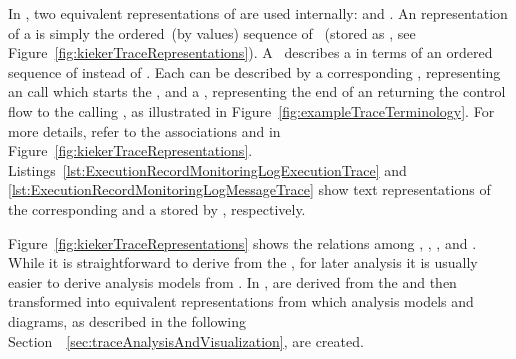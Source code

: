 In \KiekerTpan{}, two equivalent representations of \traces{} are used internally: %
\executionTraces{} and \messageTraces{}. %
An \executionTrace{} representation of a \trace{} is simply the ordered~(by %
\eoiLong{} values) sequence of \executions{}~(stored as \KiekerExecutionRecords{}, see Figure~\ref{fig:kiekerTraceRepresentations}). %
A~\messageTrace{} describes a \trace{} in terms of an ordered sequence of \Messages{} %
instead of \executions{}. %
Each \execution{} can be described by a corresponding \callMessage{}, %
representing an \operation{} call which starts the \execution{}, %
and a \returnMessage{}, representing the end of an \execution{} returning the %
control flow to the calling \execution{}, as illustrated in Figure~\ref{fig:exampleTraceTerminology}. %
For more details, refer to the associations \sender{} and \receiver{} in Figure~\ref{fig:kiekerTraceRepresentations}.
Listings~\ref{lst:ExecutionRecordMonitoringLogExecutionTrace} and \ref{lst:ExecutionRecordMonitoringLogMessageTrace} %
show text representations of the corresponding \executionTrace{} and a \messageTrace{} stored by \KiekerTpan{}, respectively.

Figure~\ref{fig:kiekerTraceRepresentations} shows the relations among \executions{}, %
\Messages{}, \executionTraces{}, and \messageTraces{}. %
While it is straightforward to derive \executionTraces{} from the \MonitoringLog{}, %
for later analysis it is usually easier to derive analysis models from \messageTraces{}. %
In \KiekerTpan{}, \executionTraces{} are derived from the \MonitoringLog{} and %
then transformed into equivalent \messageTrace{} representations from which %
analysis models and diagrams, as described in the following \mbox{Section~%
\ref{sec:traceAnalysisAndVisualization}}, are created.




